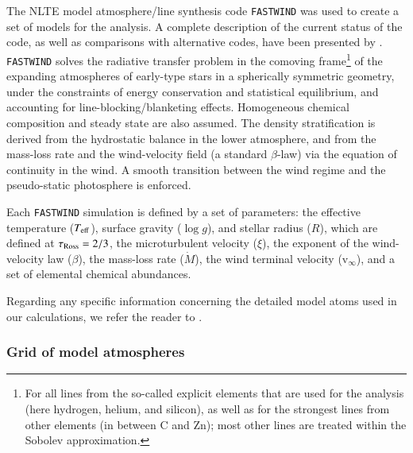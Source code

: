 \documentclass{aa}
\newcommand{\vmic}{$\xi$\xspace}
\newcommand{\Teff}{\mbox{$T_{\rm eff}$}\xspace}
\newcommand{\logg}{\mbox{$\log g$}\xspace}
\begin{document}
The NLTE model atmosphere/line synthesis code {\tt FASTWIND} \citep[Fast Analysis of STellar atmospheres with WINDs, v10.4.7,][]{santolaya-rey97, puls05, rivero-gonzalez11, puls20} was used to create a set of models for the analysis. A complete description of the current status of the code, as well as comparisons with alternative codes, have been presented by \citet{carneiro16}. {\tt FASTWIND} solves the radiative transfer problem in the comoving frame\footnote{For all lines from the so-called explicit elements that are used for the analysis (here hydrogen, helium, and silicon), as well as for the strongest lines from other elements (in between C and Zn); most other lines are treated within the Sobolev approximation.} of the expanding atmospheres of early-type stars in a spherically symmetric geometry, under the constraints of energy conservation and statistical equilibrium, and accounting for line-blocking/blanketing effects. Homogeneous chemical composition and steady state are also assumed. The density stratification is derived from the hydrostatic balance in the lower atmosphere, and from the mass-loss rate and the wind-velocity field (a standard $\beta$-law) via the equation of continuity in the wind. A smooth transition between the wind regime and the pseudo-static photosphere is enforced.

Each {\tt FASTWIND} simulation is defined by a set of parameters: the effective temperature (\Teff), surface gravity (\logg), and stellar radius ($R$), which are defined at $\tau_{\rm Ross} = 2/3$, the microturbulent velocity (\vmic), the exponent of the wind-velocity law ($\beta$), the mass-loss rate ($\dot{M}$), the wind terminal velocity (v$_\infty$), and a set of elemental chemical abundances.

Regarding any specific information concerning the detailed model atoms used in our calculations, we refer the reader to \citet{urbaneja05b}.


\subsubsection{Grid of model atmospheres}
\label{subsubsection:322_tmp}
\end{document}
